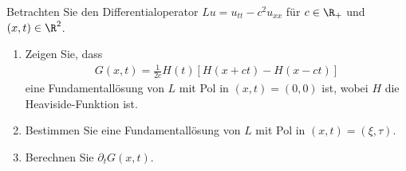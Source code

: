 
\begin{exercise}

Betrachten Sie den Differentialoperator $Lu = u_{tt} - c^2u_{xx}$ für $c \in \R_+$
und $(x,t) \in \R^2$.
\begin{enumerate}[label = (\roman*)]
  \item Zeigen Sie, dass
  \begin{align*}
    G(x,t) = \frac{1}{2c}H(t)[H(x+ct) - H(x-ct)]
  \end{align*}
  eine Fundamentallösung von $L$ mit Pol in $(x,t) = (0,0)$ ist, wobei $H$
  die Heaviside-Funktion ist.
  \item Bestimmen Sie eine Fundamentallösung von $L$ mit Pol in $(x,t) = (\xi,\tau)$.
  \item Berechnen Sie $\partial_tG(x,t)$.
\end{enumerate}
\end{exercise}


\begin{solution}

\phantom{}

\end{solution}

